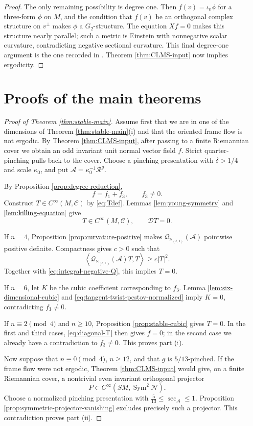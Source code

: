 \documentclass[reqno,11pt]{amsart}
\theoremstyle{definition}
\newcommand{\SM}{SM}
\newcommand{\cN}{\mathcal N}
\newcommand{\Rop}{\mathscr R}
\newcommand{\cA}{\mathcal A}
\newcommand{\cQ}{\mathcal Q}
\newcommand{\cC}{\mathcal C}
\newcommand{\Sym}{\operatorname{Sym}}
\newcommand{\cD}{\mathcal D}
\newcommand{\Hook}{\mathbb S_{(3,1)}}
\newcommand{\inner}[2]{\left\langle #1,#2\right\rangle}
\begin{document}
\begin{proof}
The only remaining possibility is degree one.  Then
$f(v)=\iota_v\phi$ for a three-form $\phi$ on $M$, and the condition that
$f(v)$ be an orthogonal complex structure on $v^\perp$ makes $\phi$ a
$G_2$-structure.  The equation $Xf=0$ makes this structure nearly parallel;
such a metric is Einstein with nonnegative scalar curvature, contradicting
negative sectional curvature.  This final degree-one argument is the one
recorded in \cite[proof of Theorem~4.1]{CLMS24}.  Theorem
\ref{thm:CLMS-input} now implies ergodicity.
\end{proof}

\section{Proofs of the main theorems}\label{sec:mainproof}

\begin{proof}[Proof of Theorem \ref{thm:stable-main}]
Assume first that we are in one of the dimensions of
Theorem \ref{thm:stable-main}\textup{(i)} and that the oriented frame flow
is not ergodic.  By Theorem \ref{thm:CLMS-input}, after passing to a finite
Riemannian cover we obtain an odd invariant unit normal vector field $f$.
Strict quarter-pinching pulls back to the cover. Choose a pinching
presentation with $\delta>1/4$ and scale $\kappa_0$, and put
$\cA=\kappa_0^{-1}\Rop^g$.

By Proposition \ref{prop:degree-reduction},
$$
  f=f_1+f_3,
  \qquad f_3\neq0.
$$
Construct $T\in C^\infty(M,\cC)$ by \eqref{eq:Tdef}.  Lemmas
\ref{lem:young-symmetry} and \ref{lem:killing-equation} give
$$
  T\in C^\infty(M,\cC),
  \qquad
  \cD T=0.
$$

If $n=4$, Proposition \ref{prop:curvature-positive} makes
$\cQ_{\Hook}(\cA)$ pointwise positive definite. Compactness gives $c>0$ such
that
$$
  \inner{\cQ_{\Hook}(\cA)T}{T}\geq c|T|^2.
$$
Together with \eqref{eq:integral-negative-Q}, this implies $T=0$.

If $n=6$, let $K$ be the cubic coefficient corresponding to $f_3$.
Lemma \ref{lem:six-dimensional-cubic} and
\eqref{eq:tangent-twist-pestov-normalized} imply $K=0$, contradicting
$f_3\neq0$.

If $n\equiv2\pmod4$ and $n\geq10$, Proposition
\ref{prop:stable-cubic} gives $T=0$.  In the first and third cases,
\eqref{eq:diagonal-T} then gives $f=0$; in the second case we already have a
contradiction to $f_3\neq0$.  This proves part \textup{(i)}.

Now suppose that $n\equiv0\pmod4$, $n\geq12$, and that $g$ is
$5/13$-pinched.  If the frame flow were not ergodic, Theorem
\ref{thm:CLMS-input} would give, on a finite Riemannian cover, a nontrivial
even invariant orthogonal projector
$$
  P\in C^\infty(\SM,\Sym^2\cN).
$$
Choose a normalized pinching presentation with
$\frac5{13}\leq\sec_{\cA}\leq1$.  Proposition
\ref{prop:symmetric-projector-vanishing} excludes precisely such a
projector.  This contradiction proves part \textup{(ii)}.
\end{proof}
\end{document}
